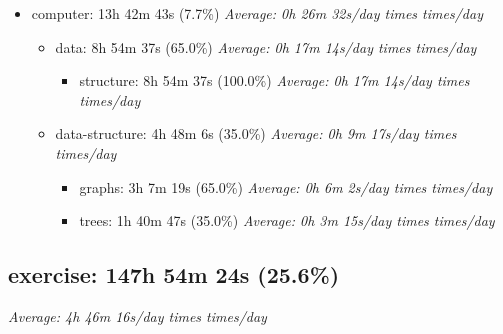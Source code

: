 \documentclass[12pt]{extarticle}
\begin{document}
\begin{itemize}[topsep=0pt, itemsep=-0.5ex]
\begin{itemize}[topsep=0pt, itemsep=-0.5ex]
    \item words: 1h 53m (9.4\%)
        \textit{Average: 0h 3m 38s/day  times  times/day}\par
    \item article: 1h 47m 17s (8.9\%)
        \textit{Average: 0h 3m 27s/day  times  times/day}\par
\end{itemize}
    \item computer: 13h 42m 43s (7.7\%)
        \textit{Average: 0h 26m 32s/day  times  times/day}\par
\begin{itemize}[topsep=0pt, itemsep=-0.5ex]
    \item data: 8h 54m 37s (65.0\%)
        \textit{Average: 0h 17m 14s/day  times  times/day}\par
\begin{itemize}[topsep=0pt, itemsep=-0.5ex]
    \item structure: 8h 54m 37s (100.0\%)
        \textit{Average: 0h 17m 14s/day  times  times/day}\par
\end{itemize}
    \item data-structure: 4h 48m 6s (35.0\%)
        \textit{Average: 0h 9m 17s/day  times  times/day}\par
\begin{itemize}[topsep=0pt, itemsep=-0.5ex]
    \item graphs: 3h 7m 19s (65.0\%)
        \textit{Average: 0h 6m 2s/day  times  times/day}\par
    \item trees: 1h 40m 47s (35.0\%)
        \textit{Average: 0h 3m 15s/day  times  times/day}\par
\end{itemize}
\end{itemize}
\end{itemize}
{\fontsize{16}{19.2}\selectfont\subsection*{exercise: 147h 54m 24s (25.6\%)}}
\textit{Average: 4h 46m 16s/day  times  times/day}\par
\end{document}
